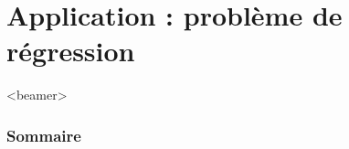 \documentclass{beamer}
\newcommand{\R}{{\ensuremath\mathbb{R}}}
\begin{document}




  
  

\section{Application : problème de régression}

\begin{frame}<beamer>
  \frametitle{Sommaire}
  \tableofcontents[currentsection]
\end{frame}
\end{document}
